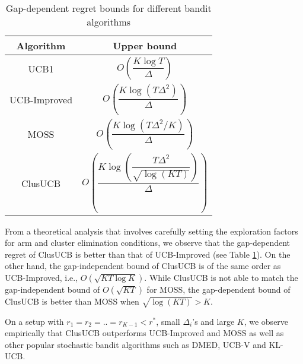 \begin{table}
\caption{Gap-dependent regret bounds for different bandit algorithms}
\label{tab:regret-bds}
\begin{center}
\begin{tabular}{|c|c|}
\toprule
Algorithm  & Upper bound \\
\midrule
UCB1         &$O\left(\dfrac{K\log T}{\Delta}\right)$ \\\midrule
UCB-Improved &$O\left(\dfrac{K\log (T\Delta^{2})}{\Delta}\right)$ \\\midrule
MOSS	     &$O\left(\dfrac{K\log\left(T\Delta^{2}/K\right)}{\Delta}\right)$\\\midrule
ClusUCB      &$O\left(\dfrac{K\log\left(\dfrac{T\Delta^{2}}{\sqrt{\log (KT)}}\right)}{\Delta}\right)$\\\bottomrule
\end{tabular}
\end{center}
\end{table}

From a theoretical analysis that involves carefully setting the exploration factors for arm and cluster elimination conditions, we observe that the gap-dependent regret of ClusUCB is better than that of UCB-Improved (see Table \ref{tab:regret-bds}). On the other hand, the gap-independent bound of ClusUCB is of the same order as UCB-Improved, i.e., $O\left(\sqrt{KT\log K}\right)$. While ClusUCB is not able to match the gap-independent bound of $O(\sqrt{KT})$ for MOSS, the gap-dependent bound of ClusUCB is better than MOSS when $\sqrt{\log (KT)} > K$.

On a setup with $r_{1}=r_{2}=..=r_{K-1}<r^{*}$, small $\Delta_{i}$'s and large $K$, we observe empirically that ClusUCB outperforms UCB-Improved\cite{auer2010ucb} and MOSS\cite{audibert2009minimax} as well as other popular stochastic bandit algorithms such as DMED\cite{honda2010asymptotically}, UCB-V\cite{audibert2009exploration} and KL-UCB\cite{garivier2011kl}.

